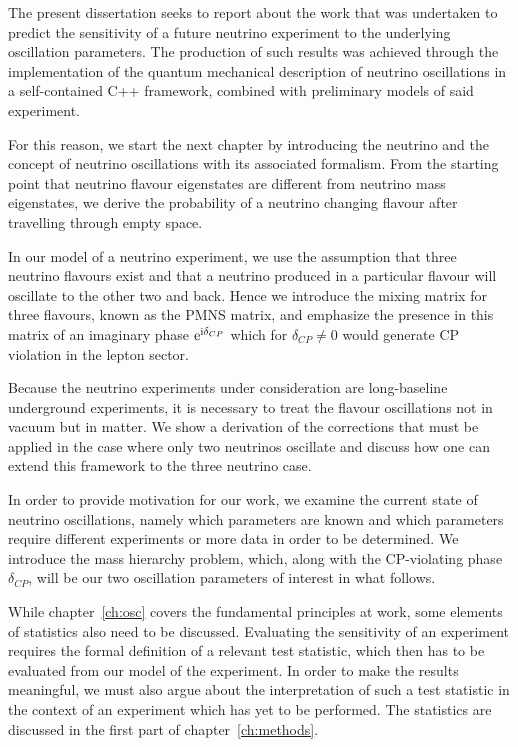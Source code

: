 \label{ch:introduction}
The present dissertation seeks to report about the work that was undertaken to
predict the sensitivity of a future neutrino experiment to the underlying
oscillation parameters. 
The production of such results was achieved through the implementation of the
quantum mechanical description of neutrino oscillations in a self-contained C++
framework, combined with preliminary models of said experiment.

For this reason, we start the next chapter by introducing the neutrino and the
concept of neutrino oscillations with its associated formalism. From the
starting point that neutrino flavour eigenstates are different from neutrino
mass eigenstates, we derive the probability of a neutrino changing flavour
after travelling through empty space. 

In our model of a neutrino experiment, we use the assumption that three
neutrino flavours exist and that a neutrino produced in a particular flavour
will oscillate to the other two and back. Hence we introduce the mixing matrix
for three flavours, known as the PMNS matrix, and emphasize the presence in this
matrix of an imaginary phase $\mathrm{e}^{\mathrm{i}\delta_{CP}}$ which for $\delta_{CP}
\neq 0$ would generate CP violation in the lepton sector.

Because the neutrino experiments under consideration are long-baseline
underground experiments, it is necessary to treat the flavour oscillations not
in vacuum but in matter. We show a derivation of the corrections that must be
applied in the case where only two neutrinos oscillate and discuss how one can
extend this framework to the three neutrino case.

In order to provide motivation for our work, we examine the current state of
neutrino oscillations, namely which parameters are known and which parameters
require different experiments or more data in order to be determined. We
introduce the mass hierarchy problem, which, along with the CP-violating phase
$\delta_{CP}$, will be our two oscillation parameters of interest in what
follows.


While chapter~\ref{ch:osc} covers the fundamental principles at work, some elements of
statistics also need to be discussed. Evaluating the sensitivity of an
experiment requires the formal definition of a relevant test statistic, which
then has to be evaluated from our model of the experiment. In order to make the
results meaningful, we must also argue about the interpretation of such a test
statistic in the context of an experiment which has yet to be performed.
The statistics are discussed in the first part of chapter~\ref{ch:methods}.

